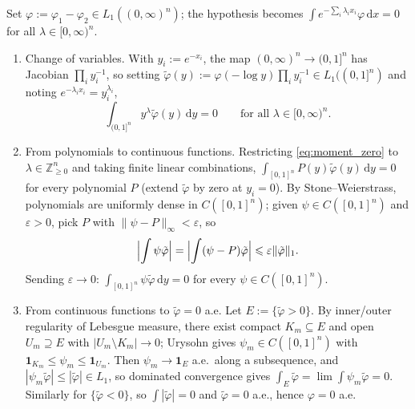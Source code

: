 \documentclass[14pt]{extarticle}
\makeatletter
\theoremstyle{definition}
\renewenvironment{proof}[1][\proofname]{\par
  \pushQED{\qed}%
  \normalfont \topsep6\p@\@plus6\p@\relax
  \trivlist
  \item[\hskip\labelsep\bfseries #1\@addpunct{.}]\ignorespaces
}{%
  \popQED\endtrivlist\@endpefalse
}
\newcommand{\dd}{\mathrm{d}}
\makeatother
\begin{document}
\begin{proof}
  Set $\varphi:=\varphi_1-\varphi_2\in L_1((0,\infty)^n)$; the
  hypothesis becomes $\int e^{-\sum_i\lambda_ix_i}\varphi\,\dd x=0$
  for all $\lambda\in[0,\infty)^n$.
  \begin{enumerate}
    \item Change of variables.  With $y_i:=e^{-x_i}$, the map
      $(0,\infty)^n\to(0,1]^n$ has Jacobian $\prod_iy_i^{-1}$, so
      setting
      $\tilde\varphi(y):=\varphi(-\log y)\prod_iy_i^{-1}\in L_1((0,1]^n)$
      and noting $e^{-\lambda_ix_i}=y_i^{\lambda_i}$,
      \begin{equation}\label{eq:moment_zero}
        \int_{(0,1]^n}y^\lambda\tilde\varphi(y)\,\dd y=0
        \qquad\text{for all }\lambda\in[0,\infty)^n.
      \end{equation}

    \item From polynomials to continuous functions.  Restricting
      \eqref{eq:moment_zero} to $\lambda\in\mathbb{Z}_{\geqslant 0}^n$
      and taking finite linear combinations,
      $\int_{[0,1]^n}P(y)\tilde\varphi(y)\,\dd y=0$ for every polynomial
      $P$ (extend $\tilde\varphi$ by zero at $y_i=0$).  By
      Stone--Weierstrass, polynomials are uniformly dense in
      $C([0,1]^n)$; given $\psi\in C([0,1]^n)$ and $\varepsilon>0$,
      pick $P$ with $\|\psi-P\|_\infty<\varepsilon$, so
      \[
        \Bigl|\int\psi\tilde\varphi\Bigr|
        =\Bigl|\int(\psi-P)\tilde\varphi\Bigr|
        \leqslant\varepsilon\|\tilde\varphi\|_1.
      \]
      Sending $\varepsilon\to 0$:
      $\int_{[0,1]^n}\psi\tilde\varphi\,\dd y=0$ for every
      $\psi\in C([0,1]^n)$.

    \item From continuous functions to $\tilde\varphi=0$ a.e.  Let
      $E:=\{\tilde\varphi>0\}$.  By inner/outer regularity of Lebesgue
      measure, there exist compact $K_m\subseteq E$ and open
      $U_m\supseteq E$ with $|U_m\setminus K_m|\to 0$; Urysohn gives
      $\psi_m\in C([0,1]^n)$ with
      $\mathbf{1}_{K_m}\leqslant\psi_m\leqslant\mathbf{1}_{U_m}$.  Then
      $\psi_m\to\mathbf{1}_E$ a.e.\ along a subsequence, and
      $|\psi_m\tilde\varphi|\leqslant|\tilde\varphi|\in L_1$, so
      dominated convergence gives
      $\int_E\tilde\varphi=\lim\int\psi_m\tilde\varphi=0$.  Similarly
      for $\{\tilde\varphi<0\}$, so $\int|\tilde\varphi|=0$ and
      $\tilde\varphi=0$ a.e., hence $\varphi=0$ a.e.
  \end{enumerate}
\end{proof}
\end{document}
